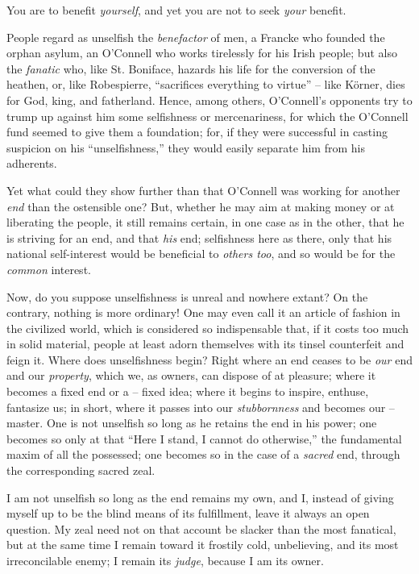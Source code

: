 You are to benefit \textit{yourself}, and yet you are not to seek 
\textit{your} benefit.

People regard as unselfish the \textit{benefactor} of men, a Francke who 
founded the orphan asylum, an O'Connell who works tirelessly for his Irish 
people; but also the \textit{fanatic} who, like St. Boniface, hazards his life 
for the conversion of the heathen, or, like Robespierre, ``sacrifices 
everything to virtue'' -- like K\"orner, dies for God, king, and fatherland. 
Hence, among others, O'Connell's opponents try to trump up against him some 
selfishness or mercenariness, for which the O'Connell fund seemed to give them 
a foundation; for, if they were successful in casting suspicion on his 
``unselfishness,'' they would easily separate him from his adherents.

Yet what could they show further than that O'Connell was working for another 
\textit{end} than the ostensible one? But, whether he may aim at making money 
or at liberating the people, it still remains certain, in one case as in the 
other, that he is striving for an end, and that \textit{his} end; selfishness 
here as there, only that his national self-interest would be beneficial to 
\textit{others too}, and so would be for the \textit{common} interest.

Now, do you suppose unselfishness is unreal and nowhere extant? On the 
contrary, nothing is more ordinary! One may even call it an article of fashion 
in the civilized world, which is considered so indispensable that, if it costs 
too much in solid material, people at least adorn themselves with its tinsel 
counterfeit and feign it. Where does unselfishness begin? Right where an end 
ceases to be \textit{our} end and our \textit{property}, which we, as owners, 
can dispose of at pleasure; where it becomes a fixed end or a -- fixed idea; 
where it begins to inspire, enthuse, fantasize us; in short, where it passes 
into our \textit{stubbornness} and becomes our -- master. One is not unselfish 
so long as he retains the end in his power; one becomes so only at that 
``Here I stand, I cannot do otherwise,'' the fundamental maxim of all the 
possessed; one becomes so in the case of a \textit{sacred} end, through the 
corresponding sacred zeal.

I am not unselfish so long as the end remains my own, and I, instead of giving 
myself up to be the blind means of its fulfillment, leave it always an open 
question. My zeal need not on that account be slacker than the most fanatical, 
but at the same time I remain toward it frostily cold, unbelieving, and its 
most irreconcilable enemy; I remain its \textit{judge}, because I am its 
owner.


